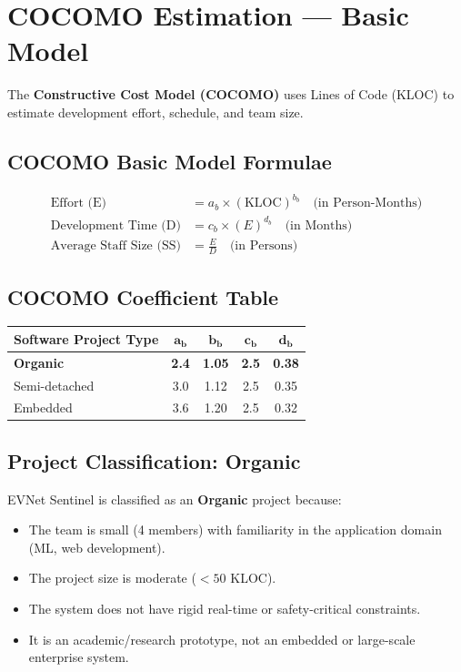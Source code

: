 \documentclass[11pt, a4paper]{article}
\begin{document}
\section{COCOMO Estimation --- Basic Model}

The \textbf{Constructive Cost Model (COCOMO)} uses Lines of Code (KLOC) to estimate development effort, schedule, and team size.

\subsection{COCOMO Basic Model Formulae}

\begin{align}
\text{Effort (E)} &= a_b \times (\text{KLOC})^{b_b} \quad \text{(in Person-Months)} \\[6pt]
\text{Development Time (D)} &= c_b \times (E)^{d_b} \quad \text{(in Months)} \\[6pt]
\text{Average Staff Size (SS)} &= \frac{E}{D} \quad \text{(in Persons)}
\end{align}

\subsection{COCOMO Coefficient Table}

\begin{center}
\renewcommand{\arraystretch}{1.3}
\begin{tabular}{|l|c|c|c|c|}
\hline
\textbf{Software Project Type} & $\boldsymbol{a_b}$ & $\boldsymbol{b_b}$ & $\boldsymbol{c_b}$ & $\boldsymbol{d_b}$ \\ \hline
\textbf{Organic}        & \textbf{2.4}  & \textbf{1.05} & \textbf{2.5}  & \textbf{0.38} \\ \hline
Semi-detached           & 3.0           & 1.12          & 2.5           & 0.35          \\ \hline
Embedded                & 3.6           & 1.20          & 2.5           & 0.32          \\ \hline
\end{tabular}
\end{center}

\subsection{Project Classification: Organic}

EVNet Sentinel is classified as an \textbf{Organic} project because:
\begin{itemize}
    \item The team is small (4 members) with familiarity in the application domain (ML, web development).
    \item The project size is moderate ($< 50$ KLOC).
    \item The system does not have rigid real-time or safety-critical constraints.
    \item It is an academic/research prototype, not an embedded or large-scale enterprise system.
\end{itemize}
\end{document}
